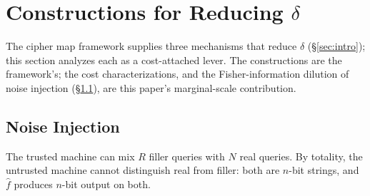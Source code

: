 \documentclass[conference]{IEEEtran}
\theoremstyle{definition}
\theoremstyle{plain}
\theoremstyle{remark}
\newcommand{\fhat}{\hat{f}}
\begin{document}
\section{Constructions for Reducing \texorpdfstring{$\delta$}{delta}}
\label{sec:levers}

The cipher map framework supplies three mechanisms that reduce
$\delta$ (\S\ref{sec:intro}); this section analyzes each as a
cost-attached lever.  The constructions are the framework's; the cost
characterizations, and the Fisher-information dilution of noise
injection (\S\ref{subsec:noise}), are this paper's marginal-scale
contribution.

\subsection{Noise Injection}
\label{subsec:noise}

The trusted machine can mix $R$ filler queries with $N$ real queries.  By
totality, the untrusted machine cannot distinguish real from filler: both
are $n$-bit strings, and $\fhat$ produces $n$-bit output on both.
\end{document}
